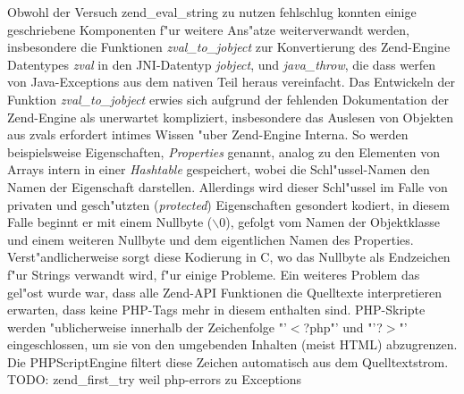Obwohl der Versuch zend\_eval\_string zu nutzen fehlschlug konnten einige geschriebene Komponenten f"ur weitere
Ans"atze weiterverwandt werden, insbesondere die Funktionen \emph{zval\_to\_jobject} zur Konvertierung des Zend-Engine
Datentypes \emph{zval} in den JNI-Datentyp \emph{jobject}, und \emph{java\_throw}, die dass werfen von Java-Exceptions
aus dem nativen Teil heraus vereinfacht. 
Das Entwickeln der Funktion \emph{zval\_to\_jobject} erwies sich aufgrund der fehlenden Dokumentation der Zend-Engine als
unerwartet kompliziert, insbesondere das Auslesen von Objekten aus zvals erfordert intimes Wissen "uber Zend-Engine Interna.
So werden beispielsweise Eigenschaften, \emph{Properties} genannt, analog zu den Elementen von Arrays intern 
in einer \emph{Hashtable} gespeichert, wobei die Schl"ussel-Namen den Namen der Eigenschaft darstellen. Allerdings wird
dieser Schl"ussel im Falle von privaten und gesch"utzten (\emph{protected}) Eigenschaften gesondert kodiert, in diesem
Falle beginnt er mit einem Nullbyte ($\backslash$0), gefolgt vom Namen der Objektklasse und einem weiteren Nullbyte und dem eigentlichen
Namen des Properties. Verst"andlicherweise sorgt diese Kodierung in C, wo das Nullbyte als Endzeichen f"ur Strings verwandt wird,
f"ur einige Probleme.
Ein weiteres Problem das gel"ost wurde war, dass alle Zend-API Funktionen die
Quelltexte interpretieren erwarten, dass keine PHP-Tags mehr in diesem enthalten sind. PHP-Skripte werden "ublicherweise
innerhalb der Zeichenfolge "'$<$?php"' und "'?$>$"' eingeschlossen, um sie von den umgebenden Inhalten (meist HTML) abzugrenzen.
Die PHPScriptEngine filtert diese Zeichen automatisch aus dem Quelltextstrom.
TODO: zend\_first\_try weil php-errors zu Exceptions

